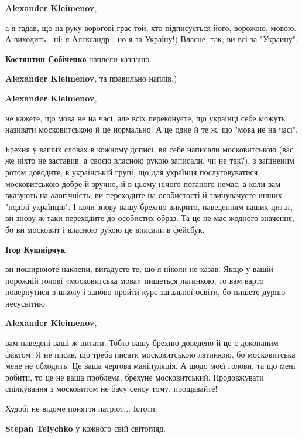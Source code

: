 \begin{itemize}
\begin{itemize}
\textbf{Alexander Kleimenov}, 

а я гадав, що на руку ворогові грає той, хто підписується його, ворожою, мовою.
А виходить - ні: я Алєксандр - но я за Украіну!) Власне, так, ви всі за
"Украину".

\textbf{Костянтин Собіченко} наплели казнащо.

\textbf{Alexander Kleimenov}, та правильно наплів.)

\textbf{Alexander Kleimenov}, 

не кажете, що мова не на часі, але всіх переконуєте, що українці себе можуть
називати московитською й це нормально. А це одне й те ж, що "мова не на часі".

Брехня у ваших словах в кожному дописі, ви себе написали московитською (вас же
ніхто не заставив, а своєю власною рукою записали, чи не так?), з запіненим
ротом доводите, в українській групі, що для українця послуговуватися
московитською добре й зручно, й в цьому нічого поганого немає, а коли вам
вказують на алогічність, ви переходите на особистості й звинувачуєте инших
"поділі українців". І коли знову вашу брехню викрито, наведенням ваших цитат,
ви знову ж таки переходите до особистих образ. Та це не має жодного значення,
бо ви московит і власною рукою це вписали в фейсбук.

\textbf{Ігор Кушнірчук} 

ви поширююте наклепи, вигадуєте те, що я ніколи не казав. Якщо у вашій порожній
голові «московитська мова» пишеться латинкою, то вам варто повернутися в школу
і заново пройти курс загальної освіти, бо пишете дурню несусвітню.

\textbf{Alexander Kleimenov}, 

\obeycr
вам наведені ваші ж цитати. Тобто вашу брехню доведено й це є доконаним фактом.
Я не писав, що треба писати московитською латинкою, бо московитська мене не обходить. Це ваша чергова маніпуляція.
А щодо моєї голови, та що мені робити, то це не ваша проблема, брехуне московитський.
Продовжувати спілкування з московитом не бачу сенсу тому, прощавайте!
\restorecr

\end{itemize} %

Худобі не відоме поняття патріот... Істоти.

\begin{itemize} %
\textbf{Stepan Telychko} у кожного свій світогляд.


\end{itemize}
\end{itemize}
